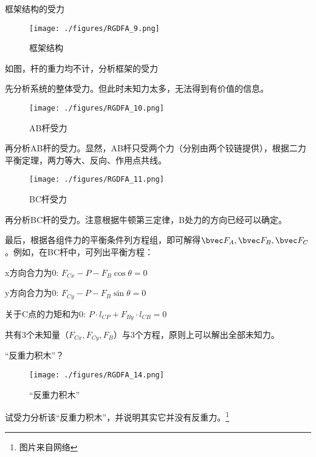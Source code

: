 \begin{example}{框架结构的受力}
\begin{figure}[ht]
\centering
\texttt{[image: ./figures/RGDFA\_9.png]}
\caption{框架结构} \label{RGDFA_fig9}
\end{figure}
如图，杆的重力均不计，分析框架的受力

先分析系统的整体受力。但此时未知力太多，无法得到有价值的信息。

\begin{figure}[ht]
\centering
\texttt{[image: ./figures/RGDFA\_10.png]}
\caption{AB杆受力} \label{RGDFA_fig10}
\end{figure}

再分析AB杆的受力。显然，AB杆只受两个力（分别由两个铰链提供），根据二力平衡定理，两力等大、反向、作用点共线。

\begin{figure}[ht]
\centering
\texttt{[image: ./figures/RGDFA\_11.png]}
\caption{BC杆受力} \label{RGDFA_fig11}
\end{figure}
再分析BC杆的受力。注意根据牛顿第三定律，B处力的方向已经可以确定。

最后，根据各组件力的平衡条件列方程组，即可解得$\bvec F_A, \bvec F_B, \bvec F_C$。例如，在BC杆中，可列出平衡方程：

x方向合力为0: $F_{Cx}-P-F_{B} \cos \theta=0$

y方向合力为0: $F_{Cy}-P-F_{B}\sin \theta=0$

关于C点的力矩和为0: $P \cdot l_{CP} + F_{By} \cdot l_{CB} = 0$

共有3个未知量（$F_{Cx}, F_{Cy}, F_B$）与3个方程，原则上可以解出全部未知力。
\end{example}
\begin{exercise}{“反重力积木”？}
\begin{figure}[ht]
\centering
\texttt{[image: ./figures/RGDFA\_14.png]}
\caption{“反重力积木”} \label{RGDFA_fig14}
\end{figure}
试受力分析该“反重力积木”，并说明其实它并没有反重力。\footnote{图片来自网络}
\end{exercise}
